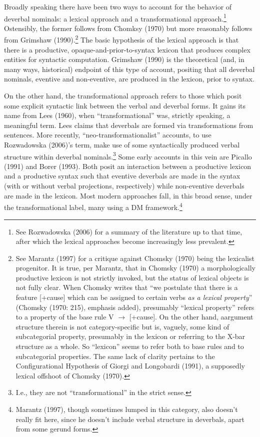 \documentclass[12pt]{article}
\begin{document}
Broadly speaking there have been two ways to account for the behavior of deverbal nominals: a lexical approach and a transformational approach.\footnote{ See Rozwadowska (2006) for a summary of the literature up to that time, after which the lexical approaches become increasingly less prevalent.} Ostensibly, the former follows from Chomksy (1970) but more reasonably follows from Grimshaw (1990).\footnote{ See Marantz (1997) for a critique against Chomsky (1970) being the lexicalist progenitor. It is true, per Marantz, that in Chomsky (1970) a morphologically productive lexicon is not strictly invoked, but the status of lexical objects is not fully clear. When Chomsky writes that ``we postulate that there is a feature [+cause] which can be assigned to certain verbs \textit{as a lexical property}'' (Chomsky (1970: 215), emphasis added), presumably ``lexical property'' refers to a property of the base rule V $\rightarrow$ [+cause]. On the other hand, aargument structure therein is not category-specific but is, vaguely, some kind of subcategorial property, presumably in the lexicon or referring to the X-bar structure as a whole. So ``lexicon'' seems to refer both to base rules and to subcategorial properties. The same lack of clarity pertains to the Configurational Hypothesis of Giorgi and Longobardi (1991), a supposedly lexical offshoot of Chomsky (1970).} The basic hypothesis of the lexical approach is that there is a productive, opaque-and-prior-to-syntax lexicon that produces complex entities for syntactic computation. Grimshaw (1990) is the theoretical (and, in many ways, historical) endpoint of this type of account, positing that all deverbal nominals, eventive and non-eventive, are produced in the lexicon, prior to syntax.

On the other hand, the transformational approach refers to those which posit some explicit syntactic link between the verbal and deverbal forms. It gains its name from Lees (1960), when ``transformational'' was, strictly speaking, a meaningful term. Lees claims that deverbals are formed via transformations from sentences. More recently, ``neo-transformationalist'' accounts, to use Rozwadowska (2006)'s term, make use of some syntactically produced verbal structure within deverbal nominals.\footnote{ I.e., they are not ``transformational'' in the strict sense.} Some early accounts in this vein are Picallo (1991) and Borer (1993). Both posit an interaction between a productive lexicon and a productive syntax such that eventive deverbals are made in the syntax (with or without verbal projections, respectively) while non-eventive deverbals are made in the lexicon. Most modern approaches fall, in this broad sense, under the transformational label, many using a DM framework.\footnote{ Marantz (1997), though sometimes lumped in this category, also doesn't really fit here, since he doesn't include verbal structure in deverbals, apart from some gerund forms.} 
\end{document}
